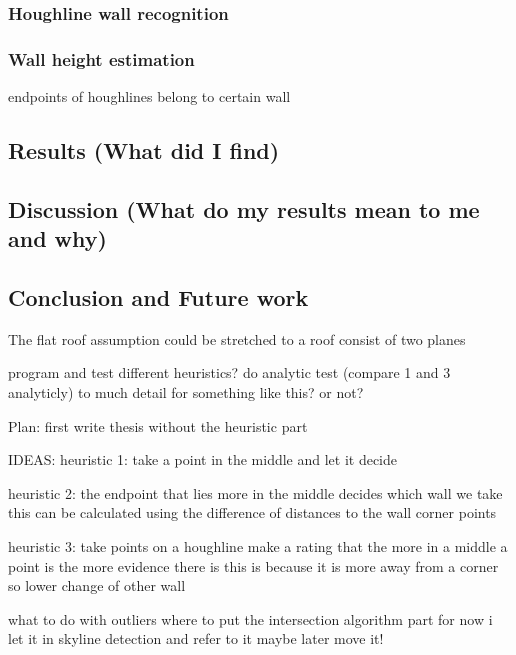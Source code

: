 \subsubsection{Houghline wall recognition}
\subsubsection{Wall height estimation}




endpoints of houghlines belong to certain wall






\subsection{Results (What did I find)}
\subsection{Discussion (What do my results mean to me and why)}
\subsection{Conclusion and Future work}
The flat roof assumption could be stretched to a roof consist of two planes


program and test different heuristics?
do analytic test (compare 1 and 3 analyticly)
	to much detail for something like this? or not?

Plan:
first write thesis without the heuristic part

IDEAS:
heuristic 1:
take a point in the middle and let it decide

heuristic 2:
the endpoint that lies more in the middle decides which wall we take
this can be calculated using the difference of distances to the wall corner points

heuristic 3:
take points on a houghline
make a rating that the more in a middle a point is the more evidence there is
this is because it is more away from a corner so lower change of other wall


what to do with outliers
where to put the intersection algorithm part
for now i let it in skyline detection and refer to it
maybe later move it!



